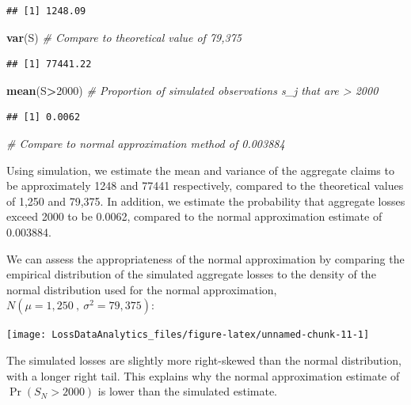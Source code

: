 \documentclass[]{book}
\newenvironment{Shaded}{\begin{snugshade}}{\end{snugshade}}
\newcommand{\KeywordTok}[1]{\textcolor[rgb]{0.13,0.29,0.53}{\textbf{#1}}}
\newcommand{\DecValTok}[1]{\textcolor[rgb]{0.00,0.00,0.81}{#1}}
\newcommand{\CommentTok}[1]{\textcolor[rgb]{0.56,0.35,0.01}{\textit{#1}}}
\newcommand{\OperatorTok}[1]{\textcolor[rgb]{0.81,0.36,0.00}{\textbf{#1}}}
\newcommand{\NormalTok}[1]{#1}
\theoremstyle{definition}
\theoremstyle{definition}
\theoremstyle{definition}
\theoremstyle{remark}
\begin{document}
\begin{verbatim}
## [1] 1248.09
\end{verbatim}

\begin{Shaded}
\begin{Highlighting}[]
\KeywordTok{var}\NormalTok{(S)  }\CommentTok{# Compare to theoretical value of 79,375}
\end{Highlighting}
\end{Shaded}

\begin{verbatim}
## [1] 77441.22
\end{verbatim}

\begin{Shaded}
\begin{Highlighting}[]
\KeywordTok{mean}\NormalTok{(S}\OperatorTok{>}\DecValTok{2000}\NormalTok{) }\CommentTok{# Proportion of simulated observations s_j that are > 2000}
\end{Highlighting}
\end{Shaded}

\begin{verbatim}
## [1] 0.0062
\end{verbatim}

\begin{Shaded}
\begin{Highlighting}[]
\CommentTok{# Compare to normal approximation method of 0.003884}
\end{Highlighting}
\end{Shaded}

Using simulation, we estimate the mean and variance of the aggregate
claims to be approximately 1248 and 77441 respectively, compared to the
theoretical values of 1,250 and 79,375. In addition, we estimate the
probability that aggregate losses exceed 2000 to be 0.0062, compared to
the normal approximation estimate of 0.003884.

We can assess the appropriateness of the normal approximation by
comparing the empirical distribution of the simulated aggregate losses
to the density of the normal distribution used for the normal
approximation, \(N(\mu=1,250~, ~\sigma^2=79,375)\):

\begin{center}\texttt{[image: LossDataAnalytics\_files/figure-latex/unnamed-chunk-11-1]} \end{center}

The simulated losses are slightly more right-skewed than the normal
distribution, with a longer right tail. This explains why the normal
approximation estimate of \(\Pr(S_N > 2000)\) is lower than the
simulated estimate.
\end{document}
